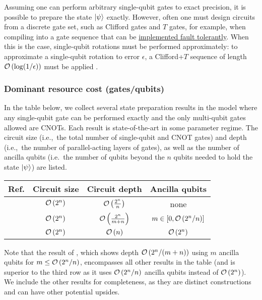 \begin{refsection}
Assuming one can perform arbitrary single-qubit gates to exact precision, it is possible to prepare the state $\lvert\psi\rangle$ exactly. However, often one must design circuits from a discrete gate set, such as Clifford gates and $T$ gates, for example, when compiling into a gate sequence that can be \hyperref[prim:LatticeSurgery]{implemented fault tolerantly}. When this is the case, single-qubit rotations must be performed approximately: to approximate a single-qubit rotation to error $\epsilon$, a Clifford+$T$ sequence of length $\mathcal{O}\left( \log(1/\epsilon) \right)$ must be applied \cite{ross2014optimal}. 



\subsubsection*{Dominant resource cost (gates/qubits)}

In the table below, we collect several state preparation results in the model where any single-qubit gate can be performed exactly and the only multi-qubit gates allowed are CNOTs. Each result is state-of-the-art in some parameter regime. The circuit size (i.e.,~the total number of single-qubit and CNOT gates) and depth (i.e.,~the number of parallel-acting layers of gates), as well as the number of ancilla qubits (i.e.~the number of qubits beyond the $n$ qubits needed to hold the state $\lvert\psi\rangle$) are listed. 

\begin{table}[!ht]
\renewcommand{\arraystretch}{1.2}
\centering
\begin{tabular}{c|c|c|c}
\textbf{Ref.} & \textbf{Circuit size} & \textbf{Circuit depth} & \textbf{Ancilla qubits} \\
\hline
\hline
\cite{sun2021asymptotically,yuan2023optimalControlledStatePrep} & $\mathcal{O}\left( 2^n \right)$ & $\mathcal{O}\left( \frac{2^n}{n} \right)$ & none \\
\hline
\cite{sun2021asymptotically,yuan2023optimalControlledStatePrep}  & $\mathcal{O}\left( 2^n \right)$ & $\mathcal{O}\left( \frac{2^n}{m+n} \right)$ & $m \in [0,\mathcal{O}\left( 2^n/n \right)]$ \\
\hline
\cite{sun2021asymptotically,zhang2022StatePrepOptimal,gui2023spacetime} & $\mathcal{O}\left( 2^n \right)$ & $\mathcal{O}\left( n \right)$ & $\mathcal{O}\left( 2^n \right)$ \\
\end{tabular}
\end{table}
Note that the result of \cite{yuan2023optimalControlledStatePrep}, which shows depth $\mathcal{O}\left( 2^n/(m+n) \right)$ using $m$ ancilla qubits for $m \leq \mathcal{O}\left( 2^n/n \right)$, encompasses all other results in the table (and is superior to the third row as it uses $\mathcal{O}\left( 2^n/n \right)$ ancilla qubits instead of $\mathcal{O}\left( 2^n \right)$). We include the other results for completeness, as they are distinct constructions and can have other potential upsides.  


\end{refsection}
